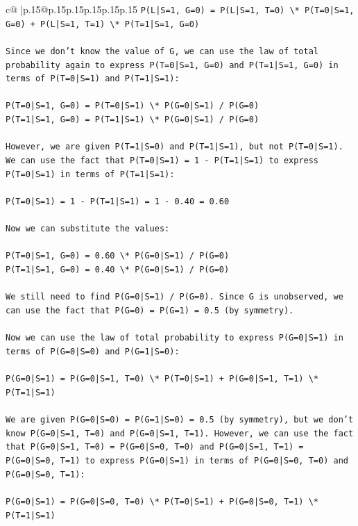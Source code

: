 \documentclass{article}
\begin{document}
{\begin{supertabular}{c@{$\;$}|p{.15\linewidth}@{}p{.15\linewidth}p{.15\linewidth}p{.15\linewidth}p{.15\linewidth}p{.15\linewidth}}
{{{\texttt{P(L|S=1, G=0) = P(L|S=1, T=0) \textbackslash{}* P(T=0|S=1, G=0) + P(L|S=1, T=1) \textbackslash{}* P(T=1|S=1, G=0)} \\
\\ 
\texttt{Since we don't know the value of G, we can use the law of total probability again to express P(T=0|S=1, G=0) and P(T=1|S=1, G=0) in terms of P(T=0|S=1) and P(T=1|S=1):} \\
\\ 
\texttt{P(T=0|S=1, G=0) = P(T=0|S=1) \textbackslash{}* P(G=0|S=1) / P(G=0)} \\
\texttt{P(T=1|S=1, G=0) = P(T=1|S=1) \textbackslash{}* P(G=0|S=1) / P(G=0)} \\
\\ 
\texttt{However, we are given P(T=1|S=0) and P(T=1|S=1), but not P(T=0|S=1). We can use the fact that P(T=0|S=1) = 1 {-} P(T=1|S=1) to express P(T=0|S=1) in terms of P(T=1|S=1):} \\
\\ 
\texttt{P(T=0|S=1) = 1 {-} P(T=1|S=1) = 1 {-} 0.40 = 0.60} \\
\\ 
\texttt{Now we can substitute the values:} \\
\\ 
\texttt{P(T=0|S=1, G=0) = 0.60 \textbackslash{}* P(G=0|S=1) / P(G=0)} \\
\texttt{P(T=1|S=1, G=0) = 0.40 \textbackslash{}* P(G=0|S=1) / P(G=0)} \\
\\ 
\texttt{We still need to find P(G=0|S=1) / P(G=0). Since G is unobserved, we can use the fact that P(G=0) = P(G=1) = 0.5 (by symmetry).} \\
\\ 
\texttt{Now we can use the law of total probability to express P(G=0|S=1) in terms of P(G=0|S=0) and P(G=1|S=0):} \\
\\ 
\texttt{P(G=0|S=1) = P(G=0|S=1, T=0) \textbackslash{}* P(T=0|S=1) + P(G=0|S=1, T=1) \textbackslash{}* P(T=1|S=1)} \\
\\ 
\texttt{We are given P(G=0|S=0) = P(G=1|S=0) = 0.5 (by symmetry), but we don't know P(G=0|S=1, T=0) and P(G=0|S=1, T=1). However, we can use the fact that P(G=0|S=1, T=0) = P(G=0|S=0, T=0) and P(G=0|S=1, T=1) = P(G=0|S=0, T=1) to express P(G=0|S=1) in terms of P(G=0|S=0, T=0) and P(G=0|S=0, T=1):} \\
\\ 
\texttt{P(G=0|S=1) = P(G=0|S=0, T=0) \textbackslash{}* P(T=0|S=1) + P(G=0|S=0, T=1) \textbackslash{}* P(T=1|S=1)} \\
}}}
\end{supertabular}}
\end{document}
